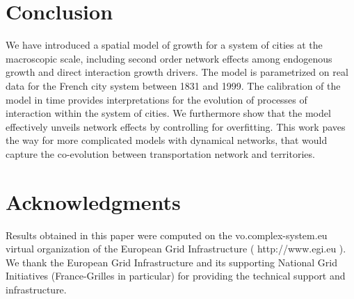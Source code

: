 \documentclass{article}
\begin{document}
\section*{Conclusion}


We have introduced a spatial model of growth for a system of cities at the macroscopic scale, including second order network effects among endogenous growth and direct interaction growth drivers. The model is parametrized on real data for the French city system between 1831 and 1999. The calibration of the model in time provides interpretations for the evolution of processes of interaction within the system of cities. We furthermore show that the model effectively unveils network effects by controlling for overfitting. This work paves the way for more complicated models with dynamical networks, that would capture the co-evolution between transportation network and territories.




\section*{Acknowledgments}
 Results obtained in this paper were computed on the vo.complex-system.eu virtual organization of the European Grid Infrastructure ( http://www.egi.eu ). We thank the European Grid Infrastructure and its supporting National Grid Initiatives (France-Grilles in particular) for providing the technical support and infrastructure.
\end{document}
